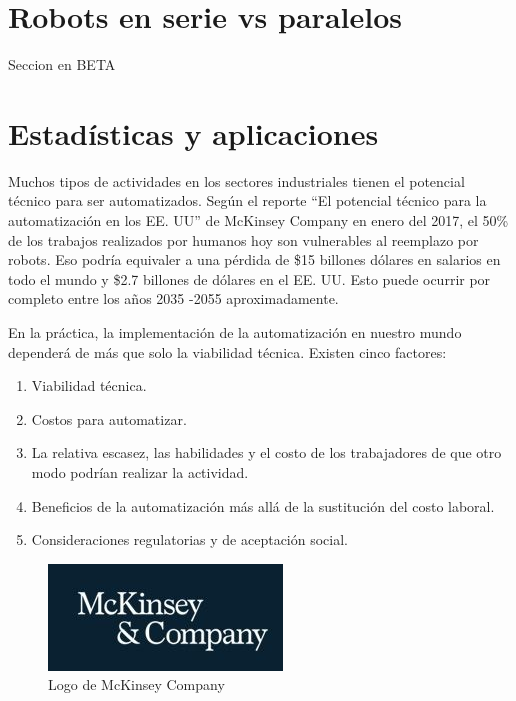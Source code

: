                 \newpage

\section{Robots en serie vs paralelos}

    Seccion en BETA
                    \newpage


\section{Estadísticas y aplicaciones}

    Muchos tipos de actividades en los sectores industriales tienen el potencial técnico para ser automatizados. Según el reporte ``El potencial técnico para la automatización en los EE. UU'' de McKinsey Company en enero del 2017, el 50\% de los trabajos realizados por humanos hoy son vulnerables al reemplazo por robots. Eso podría equivaler a una pérdida de \$15 billones dólares en salarios en todo el mundo y \$2.7 billones de dólares en el EE. UU. Esto puede ocurrir por completo entre los años 2035 -2055 aproximadamente. 
    
    En la práctica, la implementación de la automatización en nuestro mundo dependerá de más que solo la viabilidad técnica. Existen cinco factores:

        \begin{enumerate}
           \item {Viabilidad técnica.}
            \item {Costos para automatizar.}
            \item {La relativa escasez, las habilidades y el costo de los trabajadores de que otro modo podrían realizar la actividad.}
           \item {Beneficios de la automatización más allá de la sustitución del costo laboral.}
            \item {Consideraciones regulatorias y de aceptación social.}
    \end{enumerate}
    
    \begin{figure}[h]
        \centering
        \includegraphics[width=0.2\linewidth]{Main/Chapter2/Images2/LOGOMCKINSEY.jpg}
        \caption{Logo de McKinsey Company \cite{mckinsey}}
        \label{f:Cap2_general_potencial_automatizacion_11}
    \end{figure}
    
